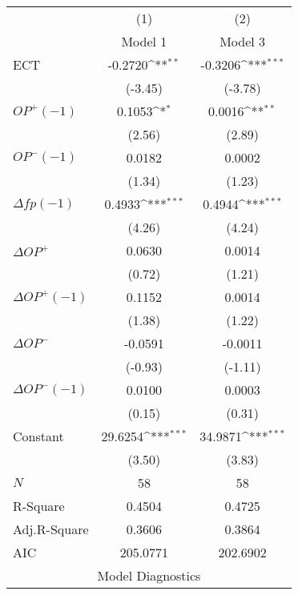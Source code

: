 \begin{table}[ht]
	\centering
	\renewcommand{\arraystretch}{1.23}
	\begin{tabularx}

		\def\sym#1{\ifmmode^{#1}\else\(^{#1}\)\fi}
		\begin{tabular}{l*{2}{c}}
			\hline
			&\multicolumn{1}{c}{(1)}&\multicolumn{1}{c}{(2)}\\
			&\multicolumn{1}{c}{Model 1}&\multicolumn{1}{c}{Model 3}\\
			\hline
			ECT         &     -0.2720\sym{**} &     -0.3206\sym{***}\\
			&     (-3.45)         &     (-3.78)         \\
			$OP^+(-1)$      &      0.1053\sym{*}  &      0.0016\sym{**} \\
			&      (2.56)         &      (2.89)         \\
			$OP^-(-1)$      &      0.0182         &      0.0002         \\
			&      (1.34)         &      (1.23)         \\
			$\Delta fp(-1)$       &      0.4933\sym{***}&      0.4944\sym{***}\\
			&      (4.26)         &      (4.24)         \\
			$\Delta OP^+$      &      0.0630         &      0.0014         \\
			&      (0.72)         &      (1.21)         \\
			$\Delta OP^+(-1)$     &      0.1152         &      0.0014         \\
			&      (1.38)         &      (1.22)         \\
			$\Delta OP^-$       &     -0.0591         &     -0.0011         \\
			&     (-0.93)         &     (-1.11)         \\
			$\Delta OP^-(-1)$     &      0.0100         &      0.0003         \\
			&      (0.15)         &      (0.31)         \\
			Constant      &     29.6254\sym{***}&     34.9871\sym{***}\\
			&      (3.50)         &      (3.83)         \\
			\hline
			\(N\)       &          58         &          58         \\
			R-Square    &      0.4504         &      0.4725         \\
			Adj.R-Square&      0.3606         &      0.3864         \\
			AIC         &    205.0771         &    202.6902         \\
			\hline\hline
			\multicolumn{3}{c}{Model Diagnostics} \\
			

\end{tabular}
\end{tabularx}
\end{table}
